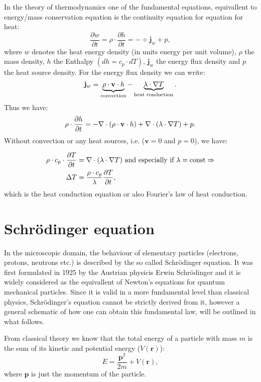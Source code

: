 In the theory of thermodynamics one of the fundamental equations, equivallent to energy/mass conservation equation is the continuity equation for equation for heat:
\begin{equation*}
  \frac{\partial w}{\partial t} = \rho \cdot \frac{\partial h}{\partial t} = -\div \bm{j}_w +p, 
\end{equation*}
where $w$ denotes the heat energy density (in units energy per unit volume), $\rho$ the mass density, $h$ the Enthalpy $(dh = c_p\cdot dT)$, $\bm{j}_w$ the energy flux density and $p$ the heat source density. For the energy flux density we can write: 
\begin{equation*}
  \mathbf{j}_w = \underbrace{\rho \cdot \mathbf{v} \cdot h}_{\text{convection}} - \underbrace{\lambda \cdot \mathbf{\nabla} T}_{\text{heat conduction}}.
\end{equation*}
Thus we have:
\begin{equation*}
   \rho \cdot \frac{\partial h}{\partial t} = -\mathbf{\nabla}\cdot (\rho \cdot \mathbf{v} \cdot h) + \mathbf{\nabla}\cdot (\lambda \cdot \mathbf{\nabla} T)  +p.  
\end{equation*}
Without convection or any heat sources, i.e. ($\bm{v} = 0 $ and $p = 0$), we have:

\begin{align}
  \rho \cdot c_p \cdot \frac{\partial T}{\partial t} &= \mathbf{\nabla}\cdot (\lambda \cdot \mathbf{\nabla} T)  \text{ and especially if } \lambda = \text{const} \Rightarrow \\
  \Delta T &= \frac{\rho \cdot c_p}{\lambda}\frac{\partial T}{\partial t}, 
\end{align}
which is the heat conduction equation or also Fourier's law of heat conduction. 


\section {Schr\"odinger equation}

In the microscopic domain, the behaviour of elementary particles (electrons, protons, neutrons etc.) is described by the so called Schr\"odinger equation. It was first formulated in 1925 by the Austrian physicis Erwin Schr\"odinger and it is widely considered as the equivallent of Newton's equations for quantum mechanical particles. Since it is valid in a more fundamental level than classical physics, Schr\"odinger's equation cannot be strictly derived from it, however a general schematic of how one can obtain this fundamental law, will be outlined in what follows. 

From classical theory we know that the total energy of a particle with mass $m$ is the sum of its kinetic and potential energy ($V(\bm{r})$): 
\begin{equation} \label{eq:hamiltonequation}
  E = \frac{\bm{p}^2}{2m}+V(\bm{r}), 
\end{equation}
where $\bm{p}$ is  just the momentum of the particle. 

